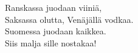 
            Ranskassa juodaan viiniä, \\
            Saksassa olutta, Venäjällä vodkaa. \\
            Suomessa juodaan kaikkea. \\
            Siis malja sille nostakaa! \\
\hspace{10mm} \\
            \begin{comment} Lisäsäkeistöt: \\
\hspace{10mm} \\
            Norjassa syödään lunta, \\
            Ruotsissa loskaa, Venäjällä paskaa. \\
            Suomessa syödään kaikkea, \\
            siis malja sille nostakaa. \\
\hspace{10mm} \\
            Norjassa poltetaan kirkkoja, \\
            Saksassa kirjoja, Venäjällä vodkaa. \\
            Hollannissa poltetaan kaikkea, \\
            siis sauhut sille ottakaa. \\
\hspace{10mm} \\
            Jouluna juodaan viiniä, \\
            wappuna skumppaa, jussina kaljaa, \\
            pääsiäisenä syödään pashaa, \\
            siis malja sille nostakaa. \\
\hspace{10mm} \\
            Kesällä sataa vettä, \\
            syksyllä vettä, talvella vettä. \\
            Keväällä sataa paskaa, \\
            siis malja sille nostakaa. \\
\hspace{10mm} \\
            Sitseillä juodaan viiniä, \\
            jatkoilla kaljaa, silliksellä skumppaa \\
            Wappuna juodaan kaikkea, \\
            siis lakit päähän laittakaa! \\
\hspace{10mm} \\
            Skoteissa nussitaan lampaita, \\
            Ruotsissa homoja, Venäjällä huoria, \\
            mut Suomessa nussitaan kaikkea. \\
            Siis malja sille nostakaa!  \\
\end{comment}